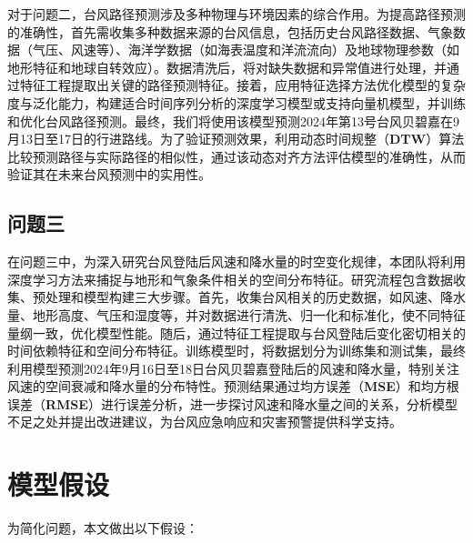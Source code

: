 \documentclass[withoutpreface,bwprint]{cumcmthesis}
\begin{document}
对于问题二，台风路径预测涉及多种物理与环境因素的综合作用。为提高路径预测的准确性，首先需收集多种数据来源的台风信息，包括历史台风路径数据、气象数据（气压、风速等）、海洋学数据（如海表温度和洋流流向）及地球物理参数（如地形特征和地球自转效应）。数据清洗后，将对缺失数据和异常值进行处理，并通过特征工程提取出关键的路径预测特征。接着，应用特征选择方法优化模型的复杂度与泛化能力，构建适合时间序列分析的深度学习模型或支持向量机模型，并训练和优化台风路径预测。最终，我们将使用该模型预测2024年第13号台风贝碧嘉在9月13日至17日的行进路线。为了验证预测效果，利用动态时间规整（\textbf{DTW}）算法比较预测路径与实际路径的相似性，通过该动态对齐方法评估模型的准确性，从而验证其在未来台风预测中的实用性。

\subsection{问题三}

在问题三中，为深入研究台风登陆后风速和降水量的时空变化规律，本团队将利用深度学习方法来捕捉与地形和气象条件相关的空间分布特征。研究流程包含数据收集、预处理和模型构建三大步骤。首先，收集台风相关的历史数据，如风速、降水量、地形高度、气压和湿度等，并对数据进行清洗、归一化和标准化，使不同特征量纲一致，优化模型性能。随后，通过特征工程提取与台风登陆后变化密切相关的时间依赖特征和空间分布特征。训练模型时，将数据划分为训练集和测试集，最终利用模型预测2024年9月16日至18日台风贝碧嘉登陆后的风速和降水量，特别关注风速的空间衰减和降水量的分布特性。预测结果通过均方误差（\textbf{MSE}）和均方根误差（\textbf{RMSE}）进行误差分析，进一步探讨风速和降水量之间的关系，分析模型不足之处并提出改进建议，为台风应急响应和灾害预警提供科学支持。

\newpage
\section{模型假设}

\noindent 为简化问题，本文做出以下假设：
\end{document}
